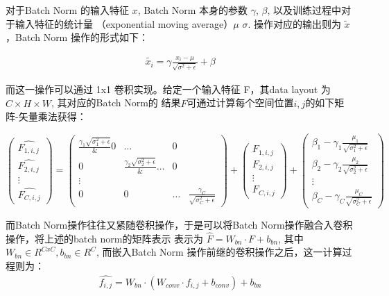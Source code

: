 对于Batch Norm 的输入特征 $x$, Batch Norm 本身的参数 $\gamma$, $\beta$, 以及训练过程中对于输入特征的统计量
（exponential moving average）$\mu$ $\sigma$. 操作对应的输出则为 $\tilde{x}$，Batch Norm 操作的形式如下：

\begin{align}
\label{eq:bn}
\tilde{x_i} = \gamma \frac{x_i - \mu}{\sqrt{\sigma^2 + \epsilon}} + \beta
\end{align}

而这一操作可以通过 1x1 卷积实现。给定一个输入特征 F，其data layout 为 $C \times H \times W$, 其对应的Batch Norm的
结果$\hat{F}$可通过计算每个空间位置$i, j$的如下矩阵-矢量乘法获得：

\begin{equation}
\label{eq:bn_matvec}
	\begin{pmatrix}
		\hat{F_{1,i,j}} \\
		\hat{F_{2,i,j}} \\
		\vdots \\
		\hat{F_{C,i,j}}
	\end{pmatrix}
	=
	\begin{pmatrix}
		\frac{\gamma_{1}{\sqrt{\sigma_{1}^2 + \epsilon}}} & 0 & \dots & 0 \\
		0 & \frac{\gamma_{2}{\sqrt{\sigma_{2}^2 + \epsilon}}}  & \dots & 0 \\
		\vdots \\
	        0 & 0 & \dots & \frac{\gamma_{C}}{\sqrt{\sigma_{C}^2 + \epsilon}}
	\end{pmatrix}
	+
	\begin{pmatrix}
		F_{1,i,j} \\
		F_{2,i,j} \\
		\vdots \\
		F_{C,i,j}
	\end{pmatrix}
	+ 
	\begin{pmatrix}
		\beta_{1} - \gamma_1 \frac{\mu_1}{\sqrt{\sigma_1^2 + \epsilon}}\\
		\beta_{2} - \gamma_2 \frac{\mu_2}{\sqrt{\sigma_2^2 + \epsilon}}\\
		\vdots \\
		\beta_{C} - \gamma_C \frac{\mu_C}{\sqrt{\sigma_C^2 + \epsilon}}
	\end{pmatrix}
\end{equation}

而Batch Norm操作往往又紧随卷积操作，于是可以将Batch Norm操作融合入卷积操作，将上述的batch norm的矩阵表示\label{eq:bn_matvec}
表示为 $\hat{F} = W_{bn} \cdot F + b_{bn}$, 其中 $W_{bn} \in R^{CxC}, b_{bn} \in R^C$, 而嵌入Batch Norm 
操作前继的卷积操作之后，这一计算过程则为：
\begin{align}
\hat{f_{i,j}} = W_{bn} \cdot (W_{conv} \cdot f_{i,j} + b_{conv}) + b_{bn}
\end{align}

